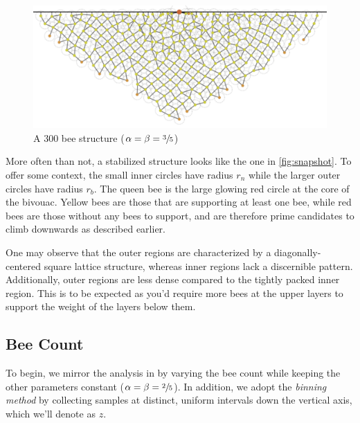 \documentclass[a4paper,10pt]{article}
\begin{document}
\begin{multicols}{2}
    \begin{figure}[H]
        \centering
        \includegraphics[width=\linewidth]{crawl_0.6_climb_0.6_size_0_mass_0_cnt_300.pdf}
        \caption{A $300$ bee structure ($\alpha = \beta = \sfrac{3}{5}$)}
        \label{fig:snapshot}
    \end{figure}

    More often than not, a stabilized structure looks like the one in \autoref{fig:snapshot}.
    To offer some context, the small inner circles have radius $r_{n}$ while the larger outer circles
    have radius $r_{b}$. The queen bee is the large glowing red circle at the core of the bivouac.
    Yellow bees are those that are supporting at least one bee, while red bees are those without
    any bees to support, and are therefore prime candidates to climb downwards as described earlier.

    One may observe that the outer regions are characterized by a diagonally-centered square
    lattice structure, whereas inner regions lack a discernible pattern. Additionally, outer
    regions are less dense compared to the tightly packed inner region. This is to be expected
    as you'd require more bees at the upper layers to support the weight of the layers below them.

    \subsection{Bee Count} \label{section:bee_count}

    To begin, we mirror the analysis in \cite{shishkov2022strength} by varying the bee count while
    keeping the other parameters constant ($\alpha = \beta = \sfrac{2}{5}$). In addition, we
    adopt the \textit{binning method} by collecting samples at distinct, uniform intervals down
    the vertical axis, which we'll denote as $z$.


\end{multicols}
\end{document}
